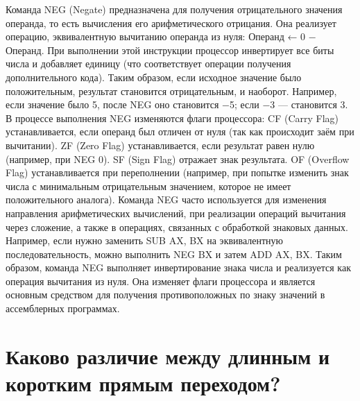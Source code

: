 Команда NEG (Negate) предназначена для получения отрицательного значения операнда, то есть вычисления его арифметического отрицания. Она реализует операцию, эквивалентную вычитанию операнда из нуля:
Операнд ← 0 − Операнд.
При выполнении этой инструкции процессор инвертирует все биты числа и добавляет единицу (что соответствует операции получения дополнительного кода). Таким образом, если исходное значение было положительным, результат становится отрицательным, и наоборот. Например, если значение было 5, после NEG оно становится −5; если −3 — становится 3.
В процессе выполнения NEG изменяются флаги процессора:
CF (Carry Flag) устанавливается, если операнд был отличен от нуля (так как происходит заём при вычитании).
ZF (Zero Flag) устанавливается, если результат равен нулю (например, при NEG 0).
SF (Sign Flag) отражает знак результата.
OF (Overflow Flag) устанавливается при переполнении (например, при попытке изменить знак числа с минимальным отрицательным значением, которое не имеет положительного аналога).
Команда NEG часто используется для изменения направления арифметических вычислений, при реализации операций вычитания через сложение, а также в операциях, связанных с обработкой знаковых данных. Например, если нужно заменить SUB AX, BX на эквивалентную последовательность, можно выполнить NEG BX и затем ADD AX, BX.
Таким образом, команда NEG выполняет инвертирование знака числа и реализуется как операция вычитания из нуля. Она изменяет флаги процессора и является основным средством для получения противоположных по знаку значений в ассемблерных программах.

\section{Каково различие между длинным и коротким прямым переходом?}

